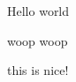 \documentclass[twocolumn]{article}
\begin{document}
Hello world

woop woop 



this is nice!
\end{document}
